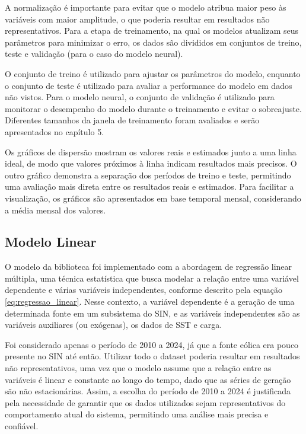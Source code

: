 A normalização é importante para evitar que o modelo atribua maior peso às variáveis com maior amplitude,
o que poderia resultar em resultados não representativos. Para a etapa de treinamento, na qual os modelos atualizam seus parâmetros 
para minimizar o erro, os dados são divididos em conjuntos de treino, teste e validação (para o caso do modelo neural). 

O conjunto de treino é utilizado para ajustar os parâmetros 
do modelo, enquanto o conjunto de teste é utilizado para avaliar a performance do modelo em dados não vistos. Para o modelo neural, 
o conjunto de validação é utilizado para monitorar o desempenho do modelo durante o treinamento e evitar o sobreajuste. 
Diferentes tamanhos da janela de treinamento foram avaliados e serão apresentados no capítulo 5.

Os gráficos de dispersão mostram os valores reais e estimados junto a uma linha ideal, de modo que valores próximos à linha indicam 
resultados mais precisos. O outro gráfico demonstra a separação dos períodos de treino e teste, permitindo uma avaliação mais direta 
entre os resultados reais e estimados. Para facilitar a visualização, os gráficos são apresentados em base temporal mensal, 
considerando a média mensal dos valores.

\subsection{Modelo Linear} %
O modelo  da biblioteca  foi implementado com a abordagem de regressão linear múltipla, 
uma técnica estatística que busca modelar a relação entre uma variável dependente e várias variáveis independentes, conforme descrito pela 
equação \ref{eq:regressao_linear}. Nesse contexto, a variável dependente é a geração de uma determinada fonte em um subsistema do 
SIN, e as variáveis independentes são as variáveis auxiliares (ou exógenas), os dados de SST e carga.

Foi considerado apenas o período de 2010 a 2024, já que a fonte eólica era pouco presente no SIN até então. Utilizar todo
o dataset poderia resultar em resultados não representativos, uma vez que o modelo assume que a relação entre as variáveis 
é linear e constante ao longo do tempo, dado que as séries de geração são não estacionárias. Assim, a escolha do período de 2010 
a 2024 é justificada pela necessidade de garantir que os dados utilizados sejam representativos do comportamento atual do 
sistema, permitindo uma análise mais precisa e confiável.

